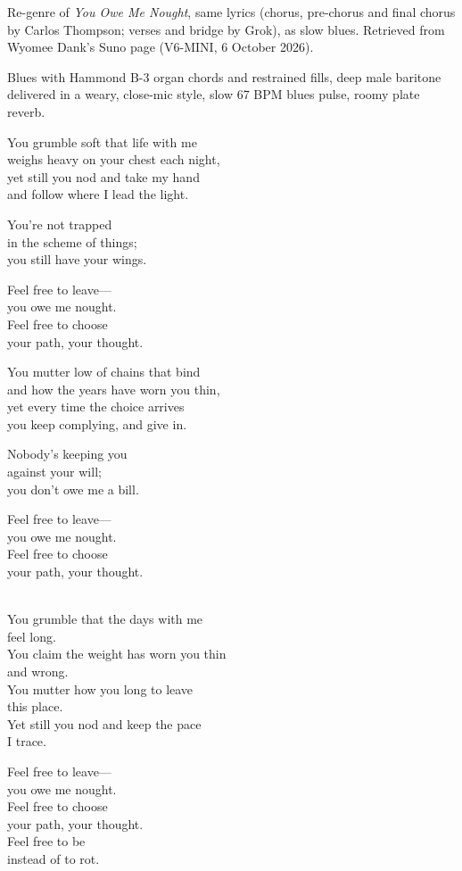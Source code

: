 
\label{sec:feel-free-to-leave}
\begin{notes}
Re-genre of \emph{You Owe Me Nought}, same lyrics (chorus, pre-chorus and final chorus by Carlos Thompson; verses and bridge by Grok), as slow blues. Retrieved from Wyomee Dank's Suno page (V6-MINI, 6 October 2026).
\end{notes}
\begin{style}
Blues with Hammond B-3 organ chords and restrained fills, deep male baritone delivered in a weary, close-mic style, slow 67 BPM blues pulse, roomy plate reverb.
\end{style}
\begin{lyrics}
You grumble soft that life with me\\
weighs heavy on your chest each night,\\
yet still you nod and take my hand\\
and follow where I lead the light.

You're not trapped\\
in the scheme of things;\\
you still have your wings.

Feel free to leave—\\
you owe me nought.\\
Feel free to choose\\
your path, your thought.

You mutter low of chains that bind\\
and how the years have worn you thin,\\
yet every time the choice arrives\\
you keep complying, and give in.

Nobody's keeping you\\
against your will;\\
you don't owe me a bill.

Feel free to leave—\\
you owe me nought.\\
Feel free to choose\\
your path, your thought.

\\
You grumble that the days with me\\
feel long.\\
You claim the weight has worn you thin\\
and wrong.\\
You mutter how you long to leave\\
this place.\\
Yet still you nod and keep the pace\\
I trace.

Feel free to leave—\\
you owe me nought.\\
Feel free to choose\\
your path, your thought.\\
Feel free to be\\
instead of to rot.
\end{lyrics}
